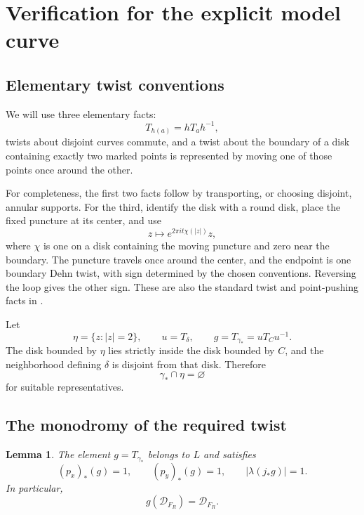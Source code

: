 \documentclass[11pt]{article}
\newcommand{\Def}{\mathcal D}
\newtheorem{lemma}[theorem]{Lemma}
\theoremstyle{definition}
\theoremstyle{remark}
\begin{document}
\section{Verification for the explicit model curve}

\subsection{Elementary twist conventions}

We will use three elementary facts:
\[
T_{h(a)}=hT_ah^{-1},
\]
twists about disjoint curves commute, and a twist about the boundary
of a disk containing exactly two marked points is represented by
moving one of those points once around the other.

For completeness, the first two facts follow by transporting, or
choosing disjoint, annular supports.  For the third, identify the disk
with a round disk, place the fixed puncture at its center, and use
\[
z\longmapsto e^{2\pi it\chi(|z|)}z,
\]
where $\chi$ is one on a disk containing the moving puncture and zero
near the boundary.  The puncture travels once around the center, and
the endpoint is one boundary Dehn twist, with sign determined by the
chosen conventions.  Reversing the loop gives the other sign.
These are also the standard twist and point-pushing facts in
\cite[Sections~3.3 and~4.2]{FM}.

Let
\[
\eta=\{z:|z|=2\},\qquad
u=T_\delta,\qquad
g=T_{\gamma_*}=uT_Cu^{-1}.
\]
The disk bounded by $\eta$ lies strictly inside the disk bounded by
$C$, and the neighborhood defining $\delta$ is disjoint from that
disk.  Therefore
\begin{equation}\label{eq:disjoint}
\gamma_*\cap\eta=\varnothing
\end{equation}
for suitable representatives.

\subsection{The monodromy of the required twist}

\begin{lemma}\label{lem:meridian}
The element $g=T_{\gamma_*}$ belongs to $L$ and satisfies
\begin{equation}\label{eq:gproperties}
(p_x)_*(g)=1,\qquad
(p_y)_*(g)=1,\qquad
|\lambda(j_*g)|=1.
\end{equation}
In particular,
\[
g(\Def_{F_R})=\Def_{F_R}.
\]
\end{lemma}
\end{document}
